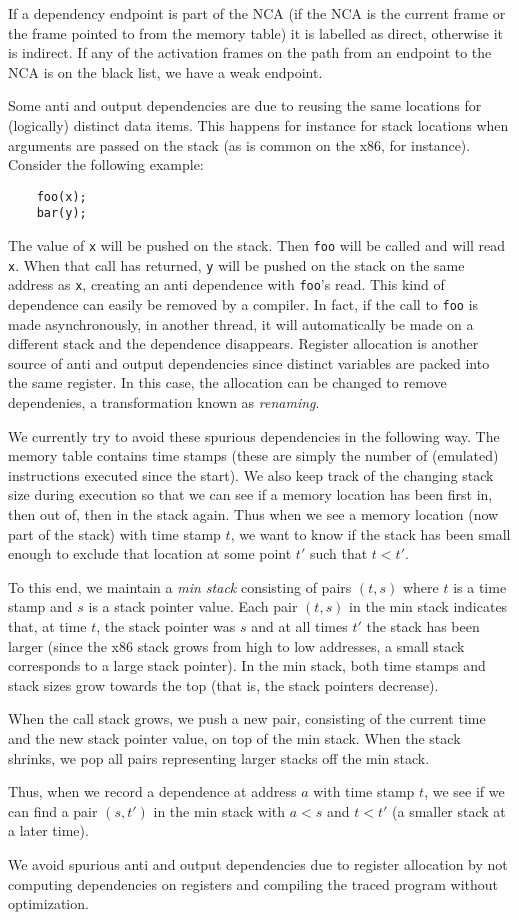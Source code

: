 If a dependency endpoint is part of the NCA (if the NCA is the current
frame or the frame pointed to from the memory table) it is labelled as
direct, otherwise it is indirect. If any of the activation frames on
the path from an endpoint to the NCA is on the black list, we have a
weak endpoint.


Some anti and output dependencies are due to reusing the same
locations for (logically) distinct data items. This happens for
instance for stack locations when arguments are passed on the stack
(as is common on the x86, for instance). Consider the following
example:
\begin{verbatim}
    foo(x);
    bar(y);
\end{verbatim}
The value of {\tt x} will be pushed on the stack. Then {\tt foo} will
be called and will read {\tt x}. When that call has returned, {\tt y}
will be pushed on the stack on the same address as {\tt x}, creating
an anti dependence with {\tt foo}'s read. This kind of dependence can 
easily be removed by a
compiler. In fact, if the call to {\tt foo} is made asynchronously, in
another thread, it will automatically be made on a different stack and
the dependence disappears. Register allocation is another source of
anti and output dependencies since distinct variables are packed into
the same register. In this case, the allocation can be changed to
remove dependenies, a transformation known as {\em renaming}.

We currently try to avoid these spurious dependencies in the following
way. The memory table contains time stamps (these are simply the
number of (emulated) instructions executed since the start). We also
keep track of the changing stack size during execution so that we can
see if a memory location has been first in, then out of, then in the
stack again. Thus when we see a memory location (now part of the
stack) with time stamp $t$, we want to know if the stack has been
small enough to exclude that location at some point $t'$ such that 
$t<t'$. 

To this end, we maintain a {\em min stack} consisting of pairs $(t,s)$
where $t$ is a time stamp and $s$ is a stack pointer value. Each pair
$(t,s)$ in the min stack indicates that, at time $t$, the stack
pointer was $s$ and at all times $t'$ the stack has been larger (since
the x86 stack grows from high to low addresses, a small stack
corresponds to a large stack pointer). In the min stack, both
time stamps and stack sizes grow towards the top (that is, the stack
pointers decrease).

When the
call stack grows, we push a new pair, consisting of the current time
and the new stack pointer value, on top of the min stack. When the
stack shrinks, we pop all pairs representing larger stacks off the min
stack.

Thus, when we record a dependence at address $a$ with time stamp $t$,
we see if we can find a pair $(s,t')$ in the min stack with $a<s$ and
$t<t'$ (a smaller stack at a later time).

We avoid spurious anti and output dependencies due to register
allocation by not computing dependencies on registers and compiling
the traced program without optimization. 
